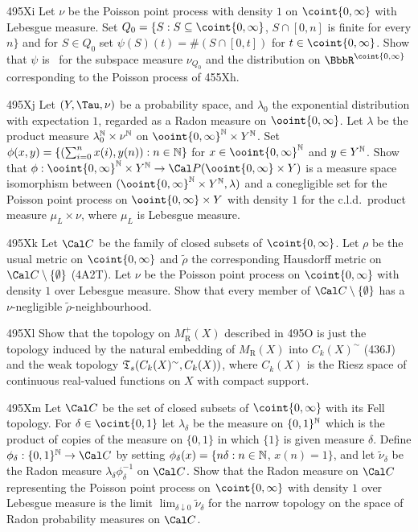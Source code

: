 {\spheader 495Xi Let $\nu$ be the Poisson point process with density $1$
on $\coint{0,\infty}$ with Lebesgue measure.   Set
$Q_0=\{S:S\subseteq\coint{0,\infty}$, $S\cap[0,n]$ is finite for every
$n\}$ and for $S\in Q_0$ set $\psi(S)(t)=\#(S\cap[0,t])$ for
$t\in\coint{0,\infty}$.   Show that $\psi$ is \imp\ for the subspace
measure $\nu_{Q_0}$ and the distribution on $\BbbR^{\coint{0,\infty}}$
corresponding to the Poisson process of 455Xh.

\spheader 495Xj Let $(Y,\Tau,\nu)$ be a probability space, and
$\lambda_0$ the exponential distribution with expectation $1$, regarded
as a Radon measure on $\ooint{0,\infty}$.   Let
$\lambda$ be the product measure $\lambda_0^{\Bbb N}\times\nu^{\Bbb N}$
on $\ooint{0,\infty}^{\Bbb N}\times Y^{\Bbb N}$.   Set
$\phi(x,y)=\{(\sum_{i=0}^nx(i),y(n)):n\in\Bbb N\}$ for
$x\in\ooint{0,\infty}^{\Bbb N}$ and $y\in Y^{\Bbb N}$.   Show that
$\phi:\ooint{0,\infty}^{\Bbb N}\times Y^{\Bbb N}
\to\Cal P(\ooint{0,\infty}\times Y)$ is a measure space isomorphism
between $(\ooint{0,\infty}^{\Bbb N}\times Y^{\Bbb N},\lambda)$ and a
conegligible set for the Poisson point process on
$\ooint{0,\infty}\times Y$ with density $1$ for the c.l.d.\ product
measure $\mu_L\times\nu$, where $\mu_L$ is Lebesgue measure.

\spheader 495Xk Let $\Cal C$ be the family of closed subsets of
$\coint{0,\infty}$.   Let $\rho$ be the usual metric on
$\coint{0,\infty}$ and $\tilde\rho$ the corresponding Hausdorff metric
on $\Cal C\setminus\{\emptyset\}$ (4A2T).
Let $\nu$ be the Poisson point process
on $\coint{0,\infty}$ with density $1$ over Lebesgue measure.   Show that
every member of $\Cal C\setminus\{\emptyset\}$ has a $\nu$-negligible
$\tilde\rho$-neighbourhood.

\spheader 495Xl Show that the topology on $M_{\text{R}}^+(X)$
described in 495O is just the topology induced by the natural embedding
of $M_{\text{R}}(X)$ into $C_k(X)^{\sim}$ (436J) and the weak topology
$\frak T_s(C_k(X)^{\sim},C_k(X))$, where $C_k(X)$ is the Riesz space
of continuous real-valued functions on $X$ with compact support.

\spheader 495Xm Let $\Cal C$ be the set of closed subsets of
$\coint{0,\infty}$ with its Fell topology.   For
$\delta\in\ocint{0,1}$ let $\lambda_{\delta}$ be the measure on
$\{0,1\}^{\Bbb N}$ which is the product of copies of the measure on
$\{0,1\}$ in which $\{1\}$ is given measure $\delta$.   Define
$\phi_{\delta}:\{0,1\}^{\Bbb N}\to\Cal C$ by setting
$\phi_{\delta}(x)=\{n\delta:n\in\Bbb N$, $x(n)=1\}$, and let
$\tilde\nu_{\delta}$ be the Radon measure
$\lambda_{\delta}\phi_{\delta}^{-1}$ on $\Cal C$.   Show that the Radon
measure on $\Cal C$ representing the Poisson
point process on $\coint{0,\infty}$ with density $1$ over Lebesgue
measure is the limit
$\lim_{\delta\downarrow 0}\tilde\nu_{\delta}$ for the narrow
topology on the space of Radon probability measures on $\Cal C$.

}
